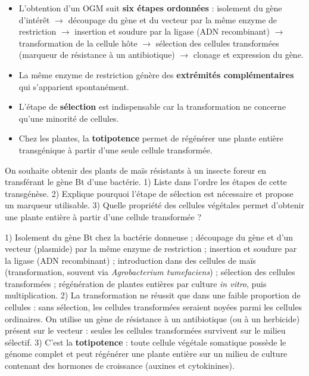 \documentclass[11pt]{article}
\begin{document}
\begin{aretenir}
\begin{itemize}
\item L'obtention d'un OGM suit \textbf{six étapes ordonnées} : isolement du gène d'intérêt $\rightarrow$ découpage du gène et du vecteur par la même enzyme de restriction $\rightarrow$ insertion et soudure par la ligase (ADN recombinant) $\rightarrow$ transformation de la cellule hôte $\rightarrow$ sélection des cellules transformées (marqueur de résistance à un antibiotique) $\rightarrow$ clonage et expression du gène.
\item La même enzyme de restriction génère des \textbf{extrémités complémentaires} qui s'apparient spontanément.
\item L'étape de \textbf{sélection} est indispensable car la transformation ne concerne qu'une minorité de cellules.
\item Chez les plantes, la \textbf{totipotence} permet de régénérer une plante entière transgénique à partir d'une seule cellule transformée.
\end{itemize}
\end{aretenir}

\begin{exercice}
On souhaite obtenir des plants de maïs résistants à un insecte foreur en transférant le gène Bt d'une bactérie. 1) Liste dans l'ordre les étapes de cette transgénèse. 2) Explique pourquoi l'étape de sélection est nécessaire et propose un marqueur utilisable. 3) Quelle propriété des cellules végétales permet d'obtenir une plante entière à partir d'une cellule transformée ?
\end{exercice}

\begin{corrige}[Exercice]
1) Isolement du gène Bt chez la bactérie donneuse ; découpage du gène et d'un vecteur (plasmide) par la même enzyme de restriction ; insertion et soudure par la ligase (ADN recombinant) ; introduction dans des cellules de maïs (transformation, souvent via \emph{Agrobacterium tumefaciens}) ; sélection des cellules transformées ; régénération de plantes entières par culture \emph{in vitro}, puis multiplication.
2) La transformation ne réussit que dans une faible proportion de cellules : sans sélection, les cellules transformées seraient noyées parmi les cellules ordinaires. On utilise un gène de résistance à un antibiotique (ou à un herbicide) présent sur le vecteur : seules les cellules transformées survivent sur le milieu sélectif.
3) C'est la \textbf{totipotence} : toute cellule végétale somatique possède le génome complet et peut régénérer une plante entière sur un milieu de culture contenant des hormones de croissance (auxines et cytokinines).
\end{corrige}
\end{document}
